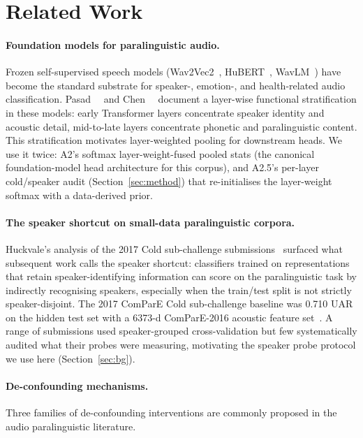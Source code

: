 \section{Related Work}
\label{sec:related}

\paragraph{Foundation models for paralinguistic audio.} Frozen self-supervised speech models (Wav2Vec2~\cite{baevski2020wav2vec2}, HuBERT~\cite{hsu2021hubert}, WavLM~\cite{chen2022wavlm}) have become the standard substrate for speaker-, emotion-, and health-related audio classification. Pasad~\etal~\cite{pasad2021layer} and Chen~\etal~\cite{chen2022wavlm} document a layer-wise functional stratification in these models: early Transformer layers concentrate speaker identity and acoustic detail, mid-to-late layers concentrate phonetic and paralinguistic content. This stratification motivates layer-weighted pooling for downstream heads. We use it twice: A2's softmax layer-weight-fused pooled stats (the canonical foundation-model head architecture for this corpus), and A2.5's per-layer cold/speaker audit (Section~\ref{sec:method}) that re-initialises the layer-weight softmax with a data-derived prior.

\paragraph{The speaker shortcut on small-data paralinguistic corpora.} Huckvale's analysis of the 2017 Cold sub-challenge submissions~\cite{huckvale2017cold} surfaced what subsequent work calls the speaker shortcut: classifiers trained on representations that retain speaker-identifying information can score on the paralinguistic task by indirectly recognising speakers, especially when the train/test split is not strictly speaker-disjoint. The 2017 ComParE Cold sub-challenge baseline was 0.710 UAR on the hidden test set with a 6373-d ComParE-2016 acoustic feature set~\cite{schuller2017interspeech}. A range of submissions used speaker-grouped cross-validation but few systematically audited what their probes were measuring, motivating the speaker probe protocol we use here (Section~\ref{sec:bg}).

\paragraph{De-confounding mechanisms.} Three families of de-confounding interventions are commonly proposed in the audio paralinguistic literature.

